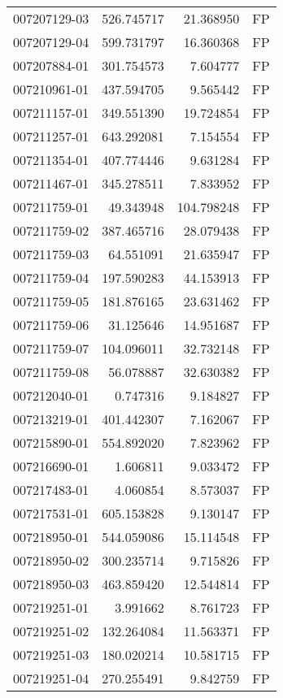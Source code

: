 \begin{tabular}{lrrl}
007207129-03 &  526.745717 &    21.368950 &   FP \\
007207129-04 &  599.731797 &    16.360368 &   FP \\
007207884-01 &  301.754573 &     7.604777 &   FP \\
007210961-01 &  437.594705 &     9.565442 &   FP \\
007211157-01 &  349.551390 &    19.724854 &   FP \\
007211257-01 &  643.292081 &     7.154554 &   FP \\
007211354-01 &  407.774446 &     9.631284 &   FP \\
007211467-01 &  345.278511 &     7.833952 &   FP \\
007211759-01 &   49.343948 &   104.798248 &   FP \\
007211759-02 &  387.465716 &    28.079438 &   FP \\
007211759-03 &   64.551091 &    21.635947 &   FP \\
007211759-04 &  197.590283 &    44.153913 &   FP \\
007211759-05 &  181.876165 &    23.631462 &   FP \\
007211759-06 &   31.125646 &    14.951687 &   FP \\
007211759-07 &  104.096011 &    32.732148 &   FP \\
007211759-08 &   56.078887 &    32.630382 &   FP \\
007212040-01 &    0.747316 &     9.184827 &   FP \\
007213219-01 &  401.442307 &     7.162067 &   FP \\
007215890-01 &  554.892020 &     7.823962 &   FP \\
007216690-01 &    1.606811 &     9.033472 &   FP \\
007217483-01 &    4.060854 &     8.573037 &   FP \\
007217531-01 &  605.153828 &     9.130147 &   FP \\
007218950-01 &  544.059086 &    15.114548 &   FP \\
007218950-02 &  300.235714 &     9.715826 &   FP \\
007218950-03 &  463.859420 &    12.544814 &   FP \\
007219251-01 &    3.991662 &     8.761723 &   FP \\
007219251-02 &  132.264084 &    11.563371 &   FP \\
007219251-03 &  180.020214 &    10.581715 &   FP \\
007219251-04 &  270.255491 &     9.842759 &   FP \\

\end{tabular}
